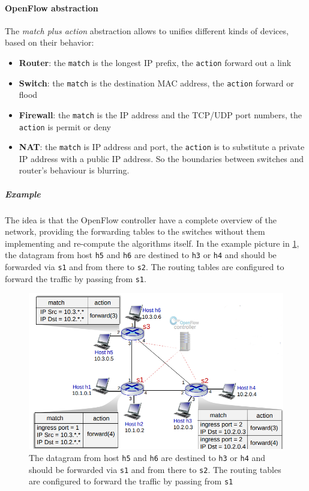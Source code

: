 \documentclass[10pt,a4paper]{report}
\theoremstyle{definition}
\begin{document}
\paragraph{OpenFlow abstraction}\label{sec:openflow-abstraction}
The \textit{match plus action} abstraction allows to unifies different kinds of devices, based on their behavior:
\begin{itemize}
	\item 
	\textbf{Router}: the \texttt{match} is the longest IP prefix, the \texttt{action} forward out a link 
	\item 
	\textbf{Switch}: the \texttt{match} is the destination MAC address, the \texttt{action} forward or flood
	\item 
	\textbf{Firewall}: the \texttt{match} is the IP address and the TCP/UDP port numbers, the \texttt{action} is permit or deny
	\item \textbf{NAT}: the \texttt{match} is IP address and port, the \texttt{action} is to substitute a private IP address with a public IP address.
	So the boundaries between switches and router's behaviour is blurring.
\end{itemize}
\subparagraph{Example}\label{sec:example-2}
The idea is that the OpenFlow controller have a complete overview of the network, providing the forwarding tables to the switches without them implementing and re-compute the algorithms itself.
In the example picture in \ref{example-2-diagram}, the datagram from host \texttt{h5} and \texttt{h6} are destined to \texttt{h3} or \texttt{h4} and should be forwarded via \texttt{s1} and from there to \texttt{s2}. The routing tables are configured to forward the traffic by passing from \texttt{s1}.  
\begin{figure}[h]
	\centering\includegraphics[scale=0.50]{images/image_2023-03-27_181350562.png}
	\caption{The datagram from host \texttt{h5} and \texttt{h6} are destined to \texttt{h3} or \texttt{h4} and should be forwarded via \texttt{s1} and from there to \texttt{s2}. The routing tables are configured to forward the traffic by passing from \texttt{s1}}
	\label{example-2-diagram}
\end{figure}
\end{document}
